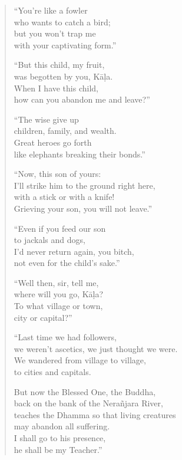 \documentclass[12pt,openany]{book}%
\begin{document}
\begin{verse}
“You’re like a fowler \\
who wants to catch a bird; \\
but you won’t trap me \\
with your captivating form.” 

“But this child, my fruit, \\
was begotten by you, \textsanskrit{Kāḷa}. \\
When I have this child, \\
how can you abandon me and leave?” 

“The wise give up \\
children, family, and wealth. \\
Great heroes go forth \\
like elephants breaking their bonds.” 

“Now, this son of yours: \\
I’ll strike him to the ground right here, \\
with a stick or with a knife! \\
Grieving your son, you will not leave.” 

“Even if you feed our son \\
to jackals and dogs, \\
I’d never return again, you bitch, \\
not even for the child’s sake.” 

“Well then, sir, tell me, \\
where will you go, \textsanskrit{Kāḷa}? \\
To what village or town, \\
city or capital?” 

“Last time we had followers, \\
we weren’t ascetics, we just thought we were. \\
We wandered from village to village, \\
to cities and capitals. 

But now the Blessed One, the Buddha, \\
back on the bank of the \textsanskrit{Nerañjara} River, \\
teaches the Dhamma so that living creatures \\
may abandon all suffering. \\
I shall go to his presence, \\
he shall be my Teacher.” 


\end{verse}
\end{document}
